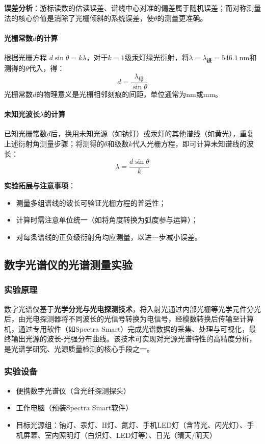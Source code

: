 \documentclass[11pt]{article}
\begin{document}
\textbf{误差分析}：游标读数的估读误差、谱线中心对准的偏差属于随机误差；而对称测量法的核心价值是消除了光栅倾斜的系统误差，使\( \theta \)的测量更准确。

\paragraph{光栅常数\( d \)的计算}
根据光栅方程 \( d\sin\theta = k\lambda \)，对于\( k=1 \)级汞灯绿光衍射，将\( \lambda = \lambda_{\text{绿}} = 546.1\ \text{nm} \)和测得的\( \theta \)代入，得：
\[ d = \frac{\lambda_{\text{绿}}}{\sin\theta} \]
光栅常数\( d \)的物理意义是光栅相邻刻痕的间距，单位通常为\( \text{nm} \)或\( \text{mm} \)。

\paragraph{未知光波长\( \lambda \)的计算}
已知光栅常数\( d \)后，换用未知光源（如钠灯）或汞灯的其他谱线（如黄光），重复上述衍射角测量步骤；将测得的\( \theta \)和级数\( k \)代入光栅方程，即可计算未知谱线的波长：
\[ \lambda = \frac{d\sin\theta}{k} \]

\textbf{实验拓展与注意事项}：
\begin{itemize}
    \item 测量多组谱线的波长可验证光栅方程的普适性；
    \item 计算时需注意单位统一（如将角度转换为弧度参与运算）；
    \item 对每条谱线的正负级衍射角均应测量，以进一步减小误差。
\end{itemize}

\subsection{数字光谱仪的光谱测量实验}
\label{subsec:digital-spectrometer}

\subsubsection{实验原理}
数字光谱仪基于\textbf{光学分光与光电探测技术}，将入射光通过内部光栅等光学元件分光后，由光电探测器将不同波长的光信号转换为电信号，经模数转换后传输至计算机，通过专用软件（如Spectra Smart）完成光谱数据的采集、处理与可视化，最终输出光源的波长-光强分布曲线。该技术可实现对光源光谱特性的高精度分析，是光谱学研究、光源质量检测的核心手段之一。

\subsubsection{实验设备}
\begin{itemize}
    \item 便携数字光谱仪（含光纤探测探头）
    \item 工作电脑（预装Spectra Smart软件）
    \item 目标光源组：钠灯、汞灯、H灯、氮灯、手机LED灯（含背光、闪光灯）、手机屏幕、室内照明灯（白炽灯、LED灯等）、日光（晴天/阴天）
\end{itemize}
\end{document}
